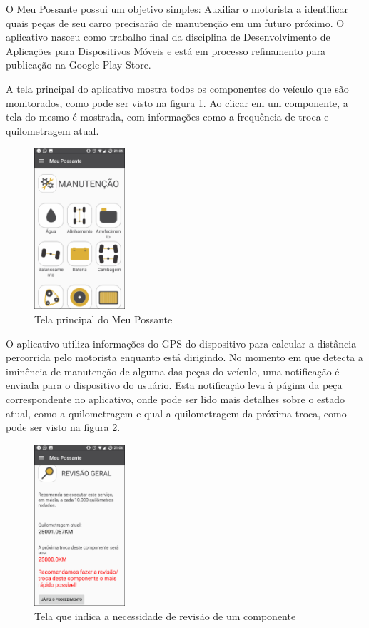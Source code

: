 O Meu Possante possui um objetivo simples: Auxiliar o motorista a identificar quais
peças de seu carro precisarão de manutenção em um futuro próximo. O aplicativo nasceu
como trabalho final da disciplina de Desenvolvimento de Aplicações para Dispositivos
Móveis e está em processo refinamento para publicação na Google Play Store.

A tela principal do aplicativo mostra todos os componentes do veículo que são monitorados,
como pode ser visto na figura \ref{meu-possante-tela-principal}. Ao clicar em um componente,
a tela do mesmo é mostrada, com informações como a frequência de troca e quilometragem
atual.

\begin{figure}[h]
\centering
\includegraphics[width=0.3\textwidth]{images/meu-possante-tela-principal.png}
\caption{Tela principal do Meu Possante}
\label{meu-possante-tela-principal}
\end{figure}

O aplicativo utiliza informações do GPS do dispositivo para calcular a distância percorrida
pelo motorista enquanto está dirigindo. No momento em que detecta a iminência de manutenção
de alguma das peças do veículo, uma notificação é enviada para o dispositivo do usuário.
Esta notificação leva à página da peça correspondente no aplicativo, onde pode ser lido
mais detalhes sobre o estado atual, como a quilometragem e qual a quilometragem da
próxima troca, como pode ser visto na figura \ref{meu-possante-tela-componente}.

\begin{figure}[h]
\centering
\includegraphics[width=0.3\textwidth]{images/meu-possante-tela-componente.png}
\caption{Tela que indica a necessidade de revisão de um componente}
\label{meu-possante-tela-componente}
\end{figure}

